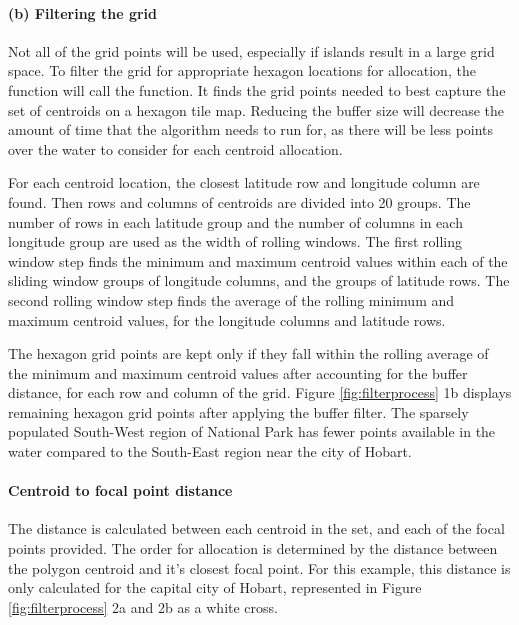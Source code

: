 \hypertarget{b-filtering-the-grid}{%
\paragraph{(b) Filtering the grid}\label{b-filtering-the-grid}}

Not all of the grid points will be used, especially if islands result in a large grid space. To filter the grid for appropriate hexagon locations for allocation, the  function will call the  function. It finds the grid points needed to best capture the set of centroids on a hexagon tile map. Reducing the buffer size will decrease the amount of time that the algorithm needs to run for, as there will be less points over the water to consider for each centroid allocation.

For each centroid location, the closest latitude row and longitude column are found. Then rows and columns of centroids are divided into 20 groups. The number of rows in each latitude group and the number of columns in each longitude group are used as the width of rolling windows. The first rolling window step finds the minimum and maximum centroid values within each of the sliding window groups of longitude columns, and the groups of latitude rows. The second rolling window step finds the average of the rolling minimum and maximum centroid values, for the longitude columns and latitude rows.

The hexagon grid points are kept only if they fall within the rolling average of the minimum and maximum centroid values after accounting for the buffer distance, for each row and column of the grid. Figure \ref{fig:filterprocess} 1b displays remaining hexagon grid points after applying the buffer filter. The sparsely populated South-West region of National Park has fewer points available in the water compared to the South-East region near the city of Hobart.

\hypertarget{centroid-to-focal-point-distance}{%
\paragraph{Centroid to focal point distance}\label{centroid-to-focal-point-distance}}

The distance is calculated between each centroid in the set, and each of the focal points provided. The order for allocation is determined by the distance between the polygon centroid and it's closest focal point. For this example, this distance is only calculated for the capital city of Hobart, represented in Figure \ref{fig:filterprocess} 2a and 2b as a white cross.

